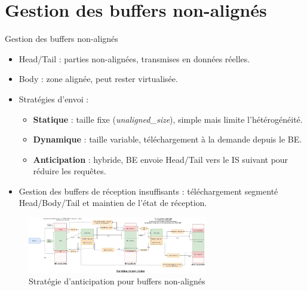 \documentclass[aspectratio=43,8pt]{beamer}
\begin{document}
\section{Gestion des buffers non-alignés}
\begin{frame}{Gestion des buffers non-alignés}
\begin{itemize}
    \item Head/Tail : parties non-alignées, transmises en données réelles.
    \item Body : zone alignée, peut rester virtualisée.
    \item Stratégies d’envoi :
    \begin{itemize}
        \item \textbf{Statique} : taille fixe (\emph{unaligned\_size}), simple mais limite l’hétérogénéité.
        \item \textbf{Dynamique} : taille variable, téléchargement à la demande depuis le BE.
        \item \textbf{Anticipation} : hybride, BE envoie Head/Tail vers le IS suivant pour réduire les requêtes.
    \end{itemize}
    \item Gestion des buffers de réception insuffisants : téléchargement segmenté Head/Body/Tail et maintien de l’état de réception.
\end{itemize}
\begin{figure}
    \centering
    \includegraphics[width=0.7\textwidth]{img/odb_adaptative_memory.png}
    \caption{Stratégie d'anticipation pour buffers non-alignés}
\end{figure}
\end{frame}
\end{document}
